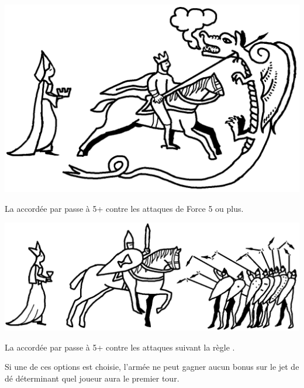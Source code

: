 \begin{multicols}{2}
\begin{center}
\includegraphics[scale=0.18]{pics/tokenoftheking.png}

\vspace*{5pt}
\textbf{\tokenoftheking}

\vspace*{5pt}
La \wardsave{} accordée par \theblessing{} passe à 5+ contre les attaques de Force 5 ou plus.
\end{center}

\columnbreak

\begin{center}
\vspace*{\fill}
\includegraphics[scale=0.18]{pics/tokenofthegrail.png}
\vspace*{26pt}

\textbf{\tokenofthegrail}

\vspace*{5pt}
La \wardsave{} accordée par \theblessing{} passe à 5+ contre les attaques suivant la règle \armourpiercing{}.
\end{center}
\end{multicols}

Si une de ces options est choisie, l'armée ne peut gagner aucun bonus sur le jet de dé déterminant quel joueur aura le premier tour. 
 
